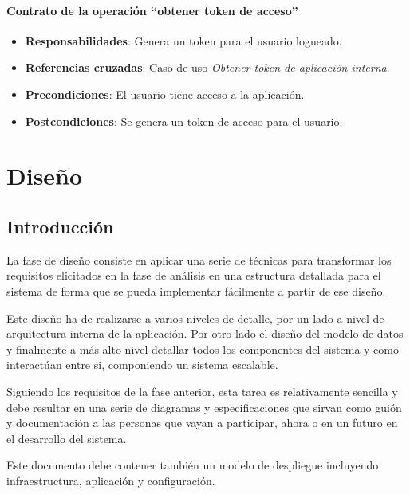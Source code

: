 \documentclass[12pt,a4paperpaper,]{report}
\providecommand{\tightlist}{%
  \setlength{\itemsep}{0pt}\setlength{\parskip}{0pt}}
\begin{document}
\subsubsection{\texorpdfstring{Contrato de la operación ``obtener token
de
acceso''}{Contrato de la operación obtener token de acceso}}\label{contrato-de-la-operaciuxf3n-obtener-token-de-acceso}

\begin{itemize}
\tightlist
\item
  \textbf{Responsabilidades}: Genera un token para el usuario logueado.
\item
  \textbf{Referencias cruzadas}: Caso de uso \emph{Obtener token de
  aplicación interna}.
\item
  \textbf{Precondiciones}: El usuario tiene acceso a la aplicación.
\item
  \textbf{Postcondiciones}: Se genera un token de acceso para el
  usuario.
\end{itemize}

\chapter{Diseño}\label{diseuxf1o}

\section{Introducción}\label{introducciuxf3n-1}

La fase de diseño consiste en aplicar una serie de técnicas para
transformar los requisitos elicitados en la fase de análisis en una
estructura detallada para el sistema de forma que se pueda implementar
fácilmente a partir de ese diseño.

Este diseño ha de realizarse a varios niveles de detalle, por un lado a
nivel de arquitectura interna de la aplicación. Por otro lado el diseño
del modelo de datos y finalmente a más alto nivel detallar todos los
componentes del sistema y como interactúan entre si, componiendo un
sistema escalable.

Siguiendo los requisitos de la fase anterior, esta tarea es
relativamente sencilla y debe resultar en una serie de diagramas y
especificaciones que sirvan como guión y documentación a las personas
que vayan a participar, ahora o en un futuro en el desarrollo del
sistema.

Este documento debe contener también un modelo de despliegue incluyendo
infraestructura, aplicación y configuración.
\end{document}
